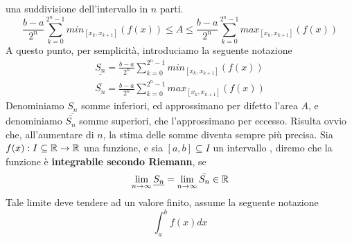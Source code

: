 \documentclass[10pt, letterpaper]{report}
\begin{document}
una suddivisione dell'intervallo in $n$ parti.
$$
    \frac{b-a}{2^n}\displaystyle \sum_{k=0}^{2^n-1}min_{[x_k,x_{k+1}]}(f(x)) \le A \le \frac{b-a}{2^n}\displaystyle
    \sum_{k=0}^{2^n-1}max_{[x_k,x_{k+1}]}(f(x))
$$
A questo punto, per semplicità, introduciamo la seguente notazione
$$ \begin{matrix}
        \underline{S_n}=\frac{b-a}{2^n}\displaystyle \sum_{k=0}^{2^n-1}min_{[x_k,x_{k+1}]}(f(x)) \\
        \bar{S_n}=\frac{b-a}{2^n}\displaystyle
        \sum_{k=0}^{2^n-1}max_{[x_k,x_{k+1}]}(f(x))
    \end{matrix}$$
Denominiamo $\underline{S_n}$ somme inferiori, ed approssimano per difetto l'area
$A$, e denominiamo $\bar{S_n}$ somme superiori, che l'approssimano per
eccesso. Risulta ovvio che, all'aumentare di $n$, la stima delle somme
diventa sempre più precisa. \acc
{} Sia $f(x) : I\subseteq{\mathbb R}\rightarrow {\mathbb R}$ una funzione, e sia $[a,b]\subseteq I$ un intervallo
, diremo che la funzione è \textbf{integrabile secondo Riemann},
se
$$\lim_{n\rightarrow\infty} \underline{S_n} =
    \lim_{n\rightarrow\infty} \bar{S_n} \in {\mathbb R}$$
Tale limite deve tendere ad un valore finito, assume la seguente notazione
$$ \int_a^bf(x)dx$$
\end{document}
